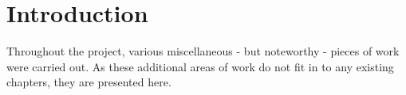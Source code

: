 \section{Introduction}
Throughout the project, various miscellaneous - but noteworthy - pieces of work
were carried out. As these additional areas of work do not fit in to any
existing chapters, they are presented here.